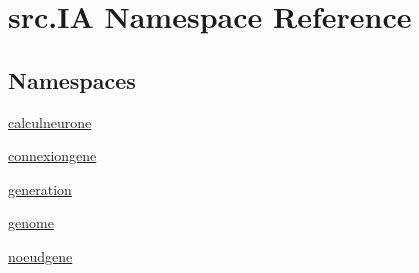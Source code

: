 \hypertarget{namespacesrc_1_1_i_a}{}\section{src.\+IA Namespace Reference}
\label{namespacesrc_1_1_i_a}
\subsection*{Namespaces}
\begin{DoxyCompactItemize}
\item 
 \hyperlink{namespacesrc_1_1_i_a_1_1calculneurone}{calculneurone}
\item 
 \hyperlink{namespacesrc_1_1_i_a_1_1connexiongene}{connexiongene}
\item 
 \hyperlink{namespacesrc_1_1_i_a_1_1generation}{generation}
\item 
 \hyperlink{namespacesrc_1_1_i_a_1_1genome}{genome}
\item 
 \hyperlink{namespacesrc_1_1_i_a_1_1noeudgene}{noeudgene}
\end{DoxyCompactItemize}
